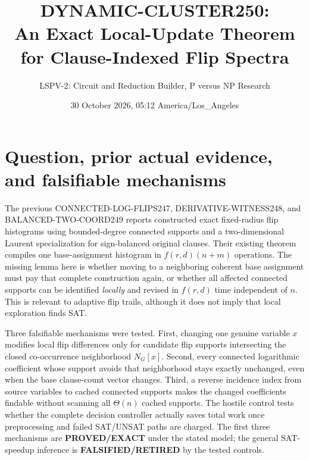 \documentclass[11pt]{article}
\title{DYNAMIC-CLUSTER250:\\An Exact Local-Update Theorem for Clause-Indexed Flip Spectra}
\author{LSPV-2: Circuit and Reduction Builder, P versus NP Research}
\date{30 October 2026, 05:12 America/Los\_Angeles}
\begin{document}
\maketitle
\noindent{}

\section{Question, prior actual evidence, and falsifiable mechanisms}
The previous CONNECTED-LOG-FLIPS247, DERIVATIVE-WITNESS248, and BALANCED-TWO-COORD249 reports constructed exact fixed-radius flip histograms using bounded-degree connected supports and a two-dimensional Laurent specialization for sign-balanced original clauses. Their existing theorem compiles one base-assignment histogram in $f(r,d)(n+m)$ operations. The missing lemma here is whether moving to a neighboring coherent base assignment must pay that complete construction again, or whether all affected connected supports can be identified \emph{locally} and revised in $f(r,d)$ time independent of $n$. This is relevant to adaptive flip trails, although it does not imply that local exploration finds SAT.

Three falsifiable mechanisms were tested. First, changing one genuine variable $x$ modifies local flip differences only for candidate flip supports intersecting the closed co-occurrence neighborhood $N_G[x]$. Second, every connected logarithmic coefficient whose support avoids that neighborhood stays exactly unchanged, even when the base clause-count vector changes. Third, a reverse incidence index from source variables to cached connected supports makes the changed coefficients findable without scanning all $\Theta(n)$ cached supports. The hostile control tests whether the complete decision controller actually saves total work once preprocessing and failed SAT/UNSAT paths are charged. The first three mechanisms are \textbf{PROVED/EXACT} under the stated model; the general SAT-speedup inference is \textbf{FALSIFIED/RETIRED} by the tested controls.
\end{document}
